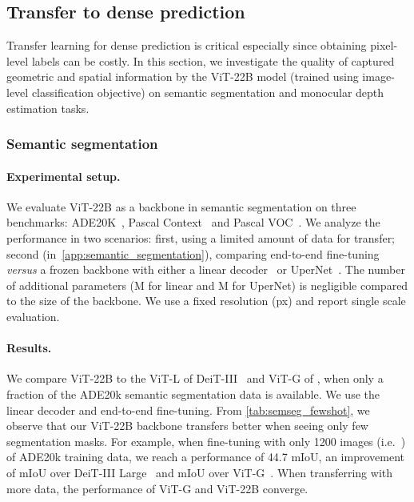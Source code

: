 \documentclass{article}
\newcommand{\chonk}{\mbox{ViT-22B}\xspace}
\begin{document}
 \subsection{Transfer to dense prediction}
Transfer learning for dense prediction is critical especially since obtaining pixel-level labels can be costly. In this section, we investigate the quality of captured geometric and spatial information by the \chonk model (trained using image-level classification objective) on semantic segmentation and monocular depth estimation tasks.


\subsubsection{Semantic segmentation}
\paragraph{Experimental setup.}
We evaluate \chonk as a backbone in semantic segmentation on three benchmarks: ADE20K~\citep{zhou2017scene}, Pascal Context~\citep{mottaghi2014role} and Pascal VOC~\citep{everingham2010pascal}.
We analyze the performance in two scenarios:
first, using a limited amount of data for transfer;
second (in~\cref{app:semantic_segmentation}), comparing end-to-end fine-tuning \textit{versus} a frozen backbone with either a linear decoder~\citep{strudel2021segmenter} or UperNet~\citep{xiao2018unified}.
The number of additional parameters (M for linear and M for UperNet) is negligible compared to the size of the backbone. We use a fixed resolution (px) and report single scale evaluation.

\paragraph{Results.}
We compare \chonk to the ViT-L of DeiT-III~\citep{touvron2022deit} and ViT-G of \citet{zhai2022scaling}, when only a fraction of the ADE20k semantic segmentation data is available. We use the linear decoder and end-to-end fine-tuning.
From \cref{tab:semseg_fewshot}, we observe that our \chonk backbone transfers better when seeing only few segmentation masks.
For example, when fine-tuning with only 1200 images (i.e.\ ) of ADE20k training data, we reach a performance of 44.7 mIoU, an improvement of  mIoU over DeiT-III Large~\citep{touvron2022deit} and  mIoU over ViT-G~\citep{zhai2022scaling}.
When transferring with more data, the performance of ViT-G and \chonk converge.
\end{document}
